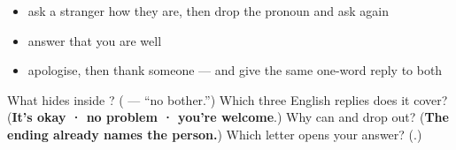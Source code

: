 \begin{itemize}
\raggedright
  \item ask a stranger how they are, then drop the pronoun and ask again
  \item answer that you are well
  \item apologise, then thank someone — and give the same one-word reply to both
\end{itemize}

\begin{tcolorbox}[breakable,colback=teal!4,colframe=teal!35!black,title={Before you move on}]
What hides inside \textbf{}? (\textbf{} — \textquotedblleft{}no bother.\textquotedblright{}) Which three English replies does it cover? (\textbf{It's okay · no problem · you're welcome}.) Why can \textbf{} and \textbf{} drop out? (\textbf{The ending already names the person.}) Which letter opens your answer? (\textbf{}.)
\end{tcolorbox}

